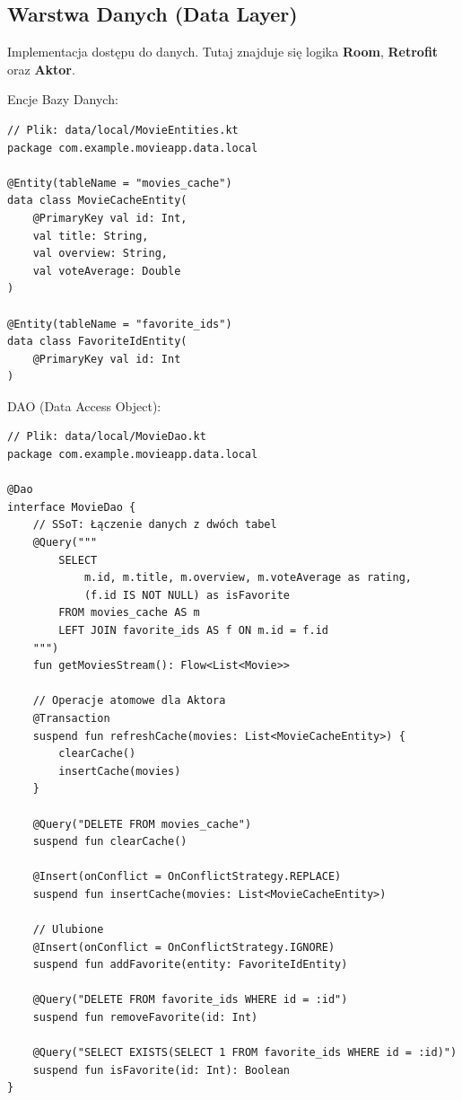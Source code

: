 \subsection{Warstwa Danych (Data Layer)}

Implementacja dostępu do danych. Tutaj znajduje się logika \textbf{Room}, \textbf{Retrofit} oraz \textbf{Aktor}.

Encje Bazy Danych:
\begin{verbatim}
// Plik: data/local/MovieEntities.kt
package com.example.movieapp.data.local

@Entity(tableName = "movies_cache")
data class MovieCacheEntity(
    @PrimaryKey val id: Int,
    val title: String,
    val overview: String,
    val voteAverage: Double
)

@Entity(tableName = "favorite_ids")
data class FavoriteIdEntity(
    @PrimaryKey val id: Int
)
\end{verbatim}

DAO (Data Access Object):
\begin{verbatim}
// Plik: data/local/MovieDao.kt
package com.example.movieapp.data.local

@Dao
interface MovieDao {
    // SSoT: Łączenie danych z dwóch tabel
    @Query("""
        SELECT 
            m.id, m.title, m.overview, m.voteAverage as rating,
            (f.id IS NOT NULL) as isFavorite
        FROM movies_cache AS m
        LEFT JOIN favorite_ids AS f ON m.id = f.id
    """)
    fun getMoviesStream(): Flow<List<Movie>>

    // Operacje atomowe dla Aktora
    @Transaction
    suspend fun refreshCache(movies: List<MovieCacheEntity>) {
        clearCache()
        insertCache(movies)
    }

    @Query("DELETE FROM movies_cache")
    suspend fun clearCache()

    @Insert(onConflict = OnConflictStrategy.REPLACE)
    suspend fun insertCache(movies: List<MovieCacheEntity>)

    // Ulubione
    @Insert(onConflict = OnConflictStrategy.IGNORE)
    suspend fun addFavorite(entity: FavoriteIdEntity)

    @Query("DELETE FROM favorite_ids WHERE id = :id")
    suspend fun removeFavorite(id: Int)

    @Query("SELECT EXISTS(SELECT 1 FROM favorite_ids WHERE id = :id)")
    suspend fun isFavorite(id: Int): Boolean
}
\end{verbatim}

